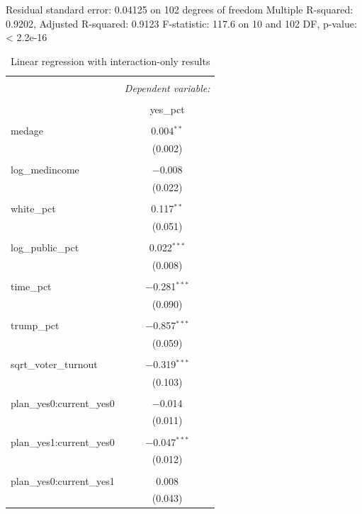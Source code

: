 \documentclass[
]{article}
\begin{document}
Residual standard error: 0.04125 on 102 degrees of freedom Multiple
R-squared: 0.9202, Adjusted R-squared: 0.9123 F-statistic: 117.6 on 10
and 102 DF, p-value: \textless{} 2.2e-16

\begin{table}[!htbp] \centering 
  \caption{Linear regression with interaction-only results} 
  \label{interactionOnlyResults} 
\begin{tabular}{@{\extracolsep{5pt}}lc} 
\\[-1.8ex]\hline 
\hline \\[-1.8ex] 
 & \multicolumn{1}{c}{\textit{Dependent variable:}} \\ 
\cline{2-2} 
\\[-1.8ex] & yes\_pct \\ 
\hline \\[-1.8ex] 
 medage & 0.004$^{**}$ \\ 
  & (0.002) \\ 
  & \\ 
 log\_medincome & $-$0.008 \\ 
  & (0.022) \\ 
  & \\ 
 white\_pct & 0.117$^{**}$ \\ 
  & (0.051) \\ 
  & \\ 
 log\_public\_pct & 0.022$^{***}$ \\ 
  & (0.008) \\ 
  & \\ 
 time\_pct & $-$0.281$^{***}$ \\ 
  & (0.090) \\ 
  & \\ 
 trump\_pct & $-$0.857$^{***}$ \\ 
  & (0.059) \\ 
  & \\ 
 sqrt\_voter\_turnout & $-$0.319$^{***}$ \\ 
  & (0.103) \\ 
  & \\ 
 plan\_yes0:current\_yes0 & $-$0.014 \\ 
  & (0.011) \\ 
  & \\ 
 plan\_yes1:current\_yes0 & $-$0.047$^{***}$ \\ 
  & (0.012) \\ 
  & \\ 
 plan\_yes0:current\_yes1 & 0.008 \\ 
  & (0.043) \\ 

\end{tabular}
\end{table}
\end{document}
